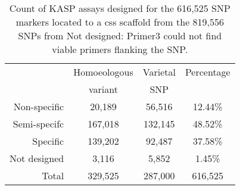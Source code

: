 
\begin{table}

\centering
\caption{Count of KASP assays designed for the 616,525 SNP markers located to a \acrshort{css} scaffold from the 819,556 SNPs from \cite{Winfield2016}   Not designed: Primer3 could not find viable primers flanking the SNP.}
\label{tab:poly:designed820k}
\begin{tabular}{rccc}
\toprule
 & Homoeologous  &     Varietal  & Percentage\\
  &  variant &      SNP & \\
\midrule
 Non-specific & 20,189                 & 56,516         & 12.44\%       \\
 Semi-specifc & 167,018                & 132,145        & 48.52\%       \\
 Specific     & 139,202                & 92,487         & 37.58\%       \\
 Not designed & 3,116                  & 5,852          & 1.45\%        \\
 \midrule
 Total        & 329,525                & 287,000        & 616,525      \\
\bottomrule
\end{tabular}
\end{table}